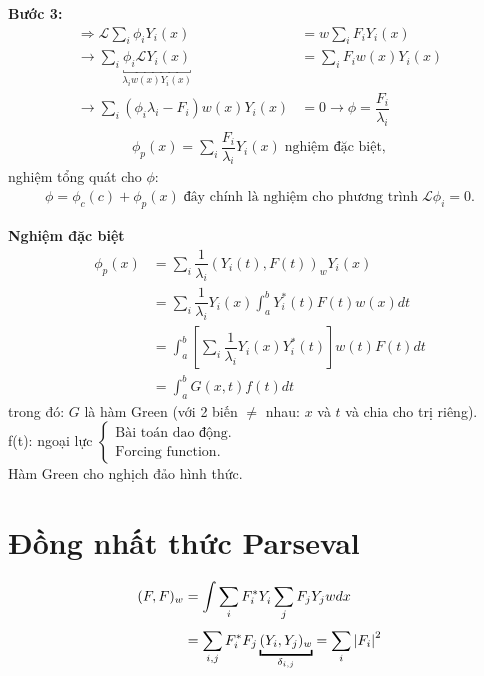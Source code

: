 \documentclass{report}
\newcommand{\f}[2]{\dfrac{#1}{#2}}
\begin{document}
\textbf{Bước 3:}
\begin{align*}
	\Rightarrow \mathcal{L}\sum_i \phi_i Y_i(x) &= w\sum_{i}F_i Y_i(x) \\ 
	\rightarrow \sum_{i} \underbracket{\phi_i \mathcal{L} Y_i(x)}_{\lambda_i w(x)Y_i(x)} &= \sum_{i} F_i w(x) Y_i(x)  \\
	\rightarrow \sum_{i}\left( \phi_i \lambda_i - F_i \right)w(x) Y_i(x) &= 0 \rightarrow \phi = \f{F_i}{\lambda_i}
\end{align*}
\begin{align*}
	\phi_p (x) = \sum_{i} \f{F_i}{\lambda_i} Y_i(x) \; \text{nghiệm đặc biệt},
\end{align*}
nghiệm tổng quát cho $\phi$:
\begin{align*}
	\phi = \phi_c(c) + \phi_p(x) \; \text{đây chính là nghiệm cho phương trình} \; \mathcal{L}\phi_i = 0.
\end{align*}

\textbf{Nghiệm đặc biệt}
\begin{align*}
	\phi_p(x) &= \sum_{i} \f{1}{\lambda_i}\left( Y_i(t), F(t) \right)_w Y_i(x) \\
	& = \sum_{i} \f{1}{\lambda_i} Y_i(x) \int_{a}^{b} Y^{\ast}_{i}(t) F(t)w(x)dt \\
	& = \int_{a}^{b} \left[ \sum_{i} \f{1}{\lambda_i} Y^{}_{i}(x) Y^{\ast}_{i}(t) \right]w(t)F(t)dt \\
	& = \int_{a}^{b} G(x,t)f(t)dt
\end{align*}
trong đó: $G$ là hàm Green (với 2 biến $\neq$ nhau: $x$ và $t$ và chia cho trị riêng).\\
f(t): ngoại lực
$\begin{cases}
	\text{Bài toán dao động.}\\
	\text{Forcing function.}
\end{cases}$\\
Hàm Green cho nghịch đảo hình thức.
\section{Đồng nhất thức Parseval}
\begin{align*}
	(F,F)_w  &= \int \sum_{i} F^{\ast}_i Y^{}_i \sum_{j} F_j Y_j w dx \\
	& =\sum_{i,j} F^{\ast}_i F_j \underbracket{(Y_i,Y_j)_w}_{\delta_{i,j}} = \sum_{i}^{}\abs{F_i}^2
\end{align*}
\end{document}
